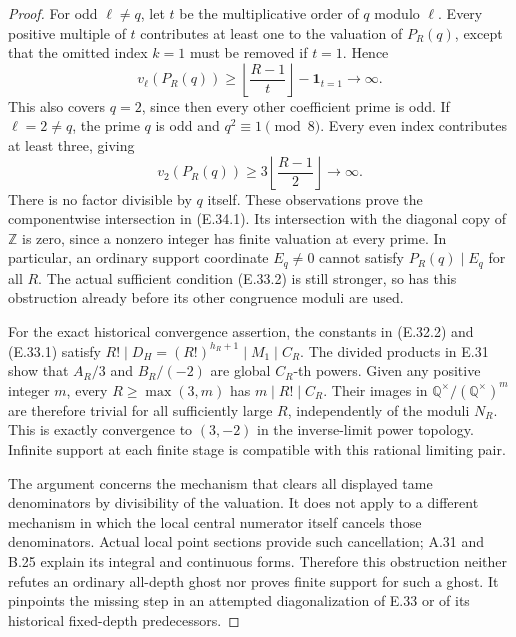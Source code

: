 \begin{proof}
For odd $\ell\ne q$, let $t$ be the multiplicative order of $q$
modulo $\ell$.  Every positive multiple of $t$ contributes at least
one to the valuation of $P_R(q)$, except that the omitted index $k=1$
must be removed if $t=1$.  Hence
\[
 v_\ell(P_R(q))\ge
 \left\lfloor\frac{R-1}{t}\right\rfloor-\mathbf1_{t=1}
 \longrightarrow\infty.
\]
This also covers $q=2$, since then every other coefficient prime is
odd.  If $\ell=2\ne q$, the prime $q$ is odd and $q^2\equiv1\pmod8$.
Every even index contributes at least three, giving
\[
 v_2(P_R(q))\ge3\left\lfloor\frac{R-1}{2}\right\rfloor
 \longrightarrow\infty.
\]
There is no factor divisible by $q$ itself.  These observations prove
the componentwise intersection in (E.34.1).  Its intersection with
the diagonal copy of $\mathbb Z$ is zero, since a nonzero integer has
finite valuation at every prime.  In particular, an ordinary support
coordinate $E_q\ne0$ cannot satisfy $P_R(q)\mid E_q$ for all $R$.
The actual sufficient condition (E.33.2) is still stronger, so has
this obstruction already before its other congruence moduli are used.

For the exact historical convergence assertion, the constants in
(E.32.2) and (E.33.1) satisfy
$R!\mid D_H=(R!)^{h_R+1}\mid M_1\mid C_R$.
The divided products in E.31 show that $A_R/3$ and
$B_R/(-2)$ are global $C_R$-th powers.
Given any positive integer $m$, every $R\geq\max(3,m)$
has $m\mid R!\mid C_R$. Their images in
$\mathbb Q^\times/(\mathbb Q^\times)^m$ are therefore
trivial for all sufficiently large $R$, independently
of the moduli $N_R$.
This is exactly convergence to $(3,-2)$ in the
inverse-limit power topology. Infinite support at each
finite stage is compatible with this rational limiting pair.

The argument concerns the mechanism that clears all displayed tame
denominators by divisibility of the valuation.  It does not apply to
a different mechanism in which the local central numerator itself
cancels those denominators.  Actual local point sections provide such
cancellation; A.31 and B.25 explain its integral and continuous forms.
Therefore this obstruction neither refutes an ordinary all-depth ghost
nor proves finite support for such a ghost.  It pinpoints the missing
step in an attempted diagonalization of E.33 or of its historical
fixed-depth predecessors.
\end{proof}
